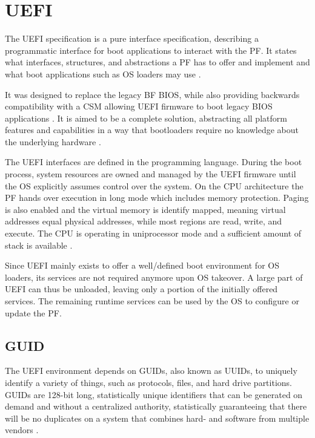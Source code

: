 
\section{\acf{UEFI}}

The \ac{UEFI} specification is a pure interface specification, describing a programmatic interface for boot applications to interact with the \ac{PF}.
It states what interfaces, structures, and abstractions a \ac{PF} has to offer and implement and what boot applications such as \ac{OS} loaders may use \cite{beyond-bios}.

It was designed to replace the legacy \acl{BF} \ac{BIOS}, while also providing backwards compatibility with a \acf{CSM} allowing \ac{UEFI} firmware to boot legacy \ac{BIOS} applications \cite{beyond-bios}.
It is aimed to be a complete solution, abstracting all platform features and capabilities in a way that bootloaders require no knowledge about the underlying hardware \cite[1.3]{uefi-spec}.

The \ac{UEFI} interfaces are defined in the  programming language.
During the boot process, system resources are owned and managed by the \ac{UEFI} firmware until the \ac{OS} explicitly assumes control over the system.
On the  \ac{CPU} architecture the \ac{PF} hands over execution in  long mode which includes memory protection.
Paging is also enabled and the virtual memory is identify mapped, meaning virtual addresses equal physical addresses, while most regions are read, write, and execute.
The \ac{CPU} is operating in uniprocessor mode and a sufficient amount of stack is available \cite[Section 2.3.4]{uefi-spec}.

Since \ac{UEFI} mainly exists to offer a well\-/defined boot environment for \ac{OS} loaders, its services are not required anymore upon \ac{OS} takeover.
A large part of \ac{UEFI} can thus be unloaded, leaving only a portion of the initially offered services.
The remaining runtime services can be used by the \ac{OS} to configure or update the \ac{PF}.

\subsection{\acf{GUID}}

The \ac{UEFI} environment depends on \acp{GUID}, also known as \acp{UUID}, to uniquely identify a variety of things, such as protocols, files, and hard drive partitions.
\acp{GUID} are 128-bit long, statistically unique identifiers that can be generated on demand and without a centralized authority, statistically guaranteeing that there will be no duplicates on a system that combines hard- and software from multiple vendors \cite{rfc-4122}.

